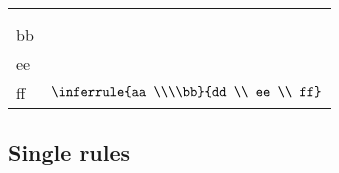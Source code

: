 \documentclass {article}
\begin{document}
\begin{tabular}{m{0.44\hsize}m{0.44\hsize}}
\begin{lstlisting}{Ocaml}
\inferrule
   {aa \\\\ bb}
   {dd \\ ee \\ ff}
\end{lstlisting}
&
$\inferrule {aa \\\\bb}{dd \\ ee \\ ff}$
\\
\end{tabular}

\subsection {Single rules}
\end{document}
